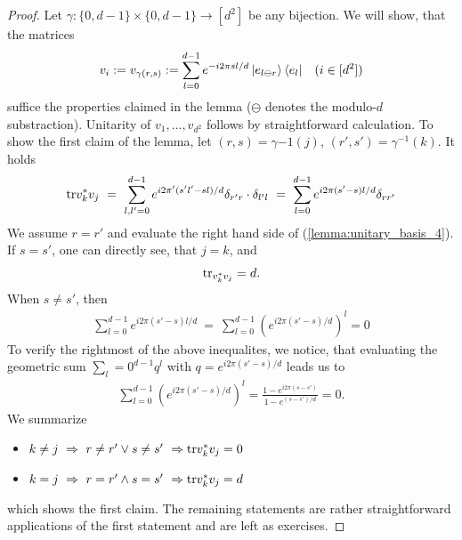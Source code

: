 \begin{proof}
	Let $\gamma: \{0,d-1\} \times \{0,d-1\} \rightarrow [d^2]$ be any bijection. We will show, that the matrices
	\begin{align*}
	v_i := v_{\gamma(r,s)} := \sum_{l=0}^{d-1} e^{-i2\pi s l /d} \ket{e_{l \ominus r}}\bra{e_l} &&(i \in [d^2]) 
	\end{align*}
	suffice the properties claimed in the lemma ($\ominus$ denotes the modulo-$d$ substraction). Unitarity of $v_1,\dots, v_{d^2}$ follows by straightforward calculation. To show the first claim of the lemma, 
	let $(r,s) = \gamma{-1}(j)$, $(r',s') = \gamma^{-1}(k)$. It holds
	\begin{align*}
	\tr v_k^\ast v_j \ 
	= \ \sum_{l,l'=0}^{d-1} e^{i2\pi'(s'l' - sl)/d} \delta_{r'r}\cdot \delta_{l'l} \
	= \ \sum_{l=0}^{d-1} e^{i2\pi(s'-s)l/d}  \delta_{rr'} \label{lemma:unitary_basis_4}
	\end{align*}
	We assume $r = r'$ and evaluate the right hand side of (\ref{lemma:unitary_basis_4}). If $s=s'$, one can directly see, that $j=k$, and 
	\begin{align*}
	\mathrm{tr}_{v_k^\ast v_j} = d.
	\end{align*}
	When $s \neq s'$, then 
	\begin{align*}
	\sum_{l=0}^{d-1} e^{i2\pi(s'-s)l/d} \ = \ \sum_{l=0}^{d-1} (e^{i2\pi(s'-s)/d})^l = 0
	\end{align*}
	To verify the rightmost of the above inequalites, we notice, that evaluating the geometric sum $\sum_l=0^{d-1} q^l$ with $q = e^{i2\pi(s'-s)/d}$ leads us to 
	\begin{align*}
	\sum_{l=0}^{d-1} (e^{i2\pi(s'-s)/d})^l = \frac{1 - e^{i2\pi(s-s')}}{1- e^{(s-s')/d}} = 0.
	\end{align*}
	We summarize
	\begin{itemize}
		\item $k \neq j \ \Rightarrow \ r \neq r' \vee s \neq s' \ \Rightarrow \mathrm{tr} v_k^\ast v_j = 0$
		\item $k = j \ \Rightarrow \ r = r' \wedge s=s' \ \Rightarrow \mathrm{tr} v_k^\ast v_j = d$
	\end{itemize}
	which shows the first claim. The remaining statements are rather straightforward applications of the first statement and are left as exercises. 
\end{proof}
